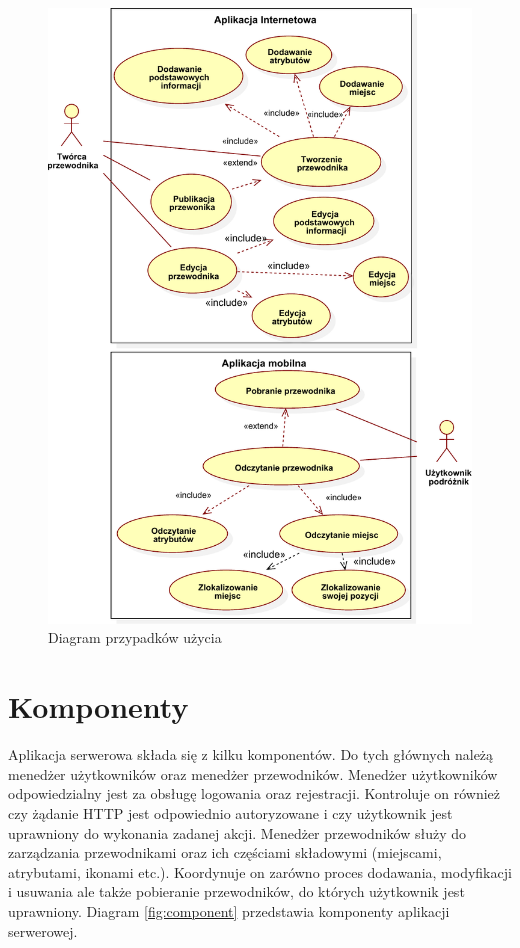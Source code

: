 \documentclass[a4paper]{book}
\begin{document}
		\begin{figure}		
			\centering
			\includegraphics[width=1.0\textwidth]{images/UseCase.pdf}
			\caption{Diagram przypadków użycia}
			\label{fig:usecase}
		\end{figure}
		
		\section{Komponenty}
		\label{id:sec:komponenty}
		Aplikacja serwerowa składa się z kilku komponentów. Do tych głównych należą menedżer użytkowników oraz menedżer przewodników. Menedżer użytkowników odpowiedzialny jest za obsługę logowania oraz rejestracji. Kontroluje on również czy żądanie HTTP jest odpowiednio autoryzowane i czy użytkownik jest uprawniony do wykonania zadanej akcji. Menedżer przewodników służy do zarządzania przewodnikami oraz ich częściami składowymi (miejscami, atrybutami, ikonami etc.). Koordynuje on zarówno proces dodawania, modyfikacji i usuwania ale także pobieranie przewodników, do których użytkownik jest uprawniony. 
		Diagram \ref{fig:component} przedstawia komponenty aplikacji serwerowej. 
		
\end{document}
